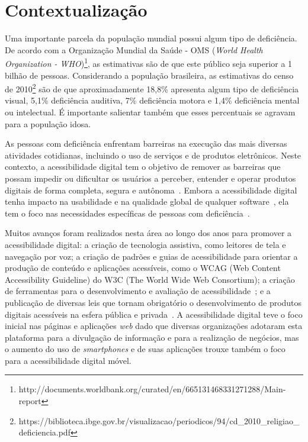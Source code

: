 

\section{Contextualização}

Uma importante parcela da população mundial possui algum tipo de deficiência. 
De acordo com a Organização Mundial da Saúde - OMS (\textit{World Health Organization - WHO})\footnote{http://documents.worldbank.org/curated/en/665131468331271288/Main-report}, 
as estimativas são de que este público seja superior a 1 bilhão de pessoas. Considerando a população brasileira, as estimativas do censo de 2010\footnote{https://biblioteca.ibge.gov.br/visualizacao/periodicos/94/cd\_2010\_religiao\_deficiencia.pdf} são de que aproximadamente 18,8\% apresenta algum tipo de deficiência visual, 5,1\% deficiência auditiva, 7\% deficiência motora e 1,4\% deficiência mental ou intelectual. É importante salientar também que esses percentuais se agravam para a população idosa.

As pessoas com deficiência enfrentam barreiras na execução das mais diversas atividades cotidianas, incluindo o uso de serviços e de produtos eletrônicos. 
Neste contexto, a acessibilidade digital tem o objetivo de remover as barreiras que possam impedir ou dificultar os usuários a perceber, entender e operar produtos digitais de forma completa, segura e autônoma~\cite{wcag,w3cwai}.
Embora a acessibilidade digital tenha impacto na usabilidade e na qualidade global de qualquer software~\cite{Gay2018,ISO25010}, ela tem o foco nas necessidades específicas de pessoas com deficiência~\cite{ISO9241:11}.


Muitos avanços foram realizados nesta área ao longo dos anos para promover a acessibilidade digital: a criação de tecnologia assistiva, como leitores de tela e navegação por voz; 
a criação de padrões e guias de acessibilidade para orientar a produção de conteúdo e aplicações acessíveis, como o WCAG (Web Content Accessibility Guideline) do W3C (The World Wide Web Consortium);
a criação de ferramentas para o desenvolvimento e avaliação de acessibilidade~\cite{Silva2018survey};
e a publicação de diversas leis que tornam obrigatório o desenvolvimento de produtos digitais acessíveis na esfera pública e privada~\cite{Lazar2019}.
A acessibilidade digital teve o foco inicial nas páginas e aplicações \textit{web} dado que diversas organizações adotaram esta plataforma para a divulgação de informação e para a realização de negócios, mas o aumento do uso de \textit{smartphones} e de suas aplicações trouxe também o foco para a acessibilidade digital móvel.



